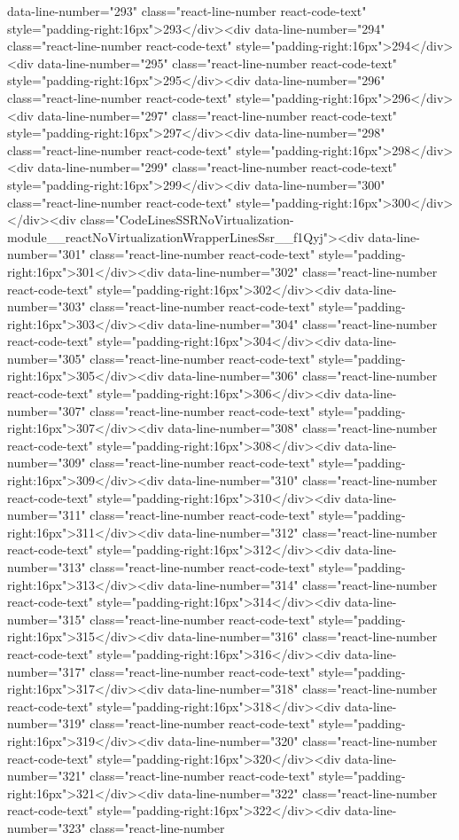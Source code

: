 {{{{{{{data-line-number="293" class="react-line-number react-code-text" style="padding-right:16px">293</div><div data-line-number="294" class="react-line-number react-code-text" style="padding-right:16px">294</div><div data-line-number="295" class="react-line-number react-code-text" style="padding-right:16px">295</div><div data-line-number="296" class="react-line-number react-code-text" style="padding-right:16px">296</div><div data-line-number="297" class="react-line-number react-code-text" style="padding-right:16px">297</div><div data-line-number="298" class="react-line-number react-code-text" style="padding-right:16px">298</div><div data-line-number="299" class="react-line-number react-code-text" style="padding-right:16px">299</div><div data-line-number="300" class="react-line-number react-code-text" style="padding-right:16px">300</div></div><div class="CodeLinesSSRNoVirtualization-module__reactNoVirtualizationWrapperLinesSsr__f1Qyj"><div data-line-number="301" class="react-line-number react-code-text" style="padding-right:16px">301</div><div data-line-number="302" class="react-line-number react-code-text" style="padding-right:16px">302</div><div data-line-number="303" class="react-line-number react-code-text" style="padding-right:16px">303</div><div data-line-number="304" class="react-line-number react-code-text" style="padding-right:16px">304</div><div data-line-number="305" class="react-line-number react-code-text" style="padding-right:16px">305</div><div data-line-number="306" class="react-line-number react-code-text" style="padding-right:16px">306</div><div data-line-number="307" class="react-line-number react-code-text" style="padding-right:16px">307</div><div data-line-number="308" class="react-line-number react-code-text" style="padding-right:16px">308</div><div data-line-number="309" class="react-line-number react-code-text" style="padding-right:16px">309</div><div data-line-number="310" class="react-line-number react-code-text" style="padding-right:16px">310</div><div data-line-number="311" class="react-line-number react-code-text" style="padding-right:16px">311</div><div data-line-number="312" class="react-line-number react-code-text" style="padding-right:16px">312</div><div data-line-number="313" class="react-line-number react-code-text" style="padding-right:16px">313</div><div data-line-number="314" class="react-line-number react-code-text" style="padding-right:16px">314</div><div data-line-number="315" class="react-line-number react-code-text" style="padding-right:16px">315</div><div data-line-number="316" class="react-line-number react-code-text" style="padding-right:16px">316</div><div data-line-number="317" class="react-line-number react-code-text" style="padding-right:16px">317</div><div data-line-number="318" class="react-line-number react-code-text" style="padding-right:16px">318</div><div data-line-number="319" class="react-line-number react-code-text" style="padding-right:16px">319</div><div data-line-number="320" class="react-line-number react-code-text" style="padding-right:16px">320</div><div data-line-number="321" class="react-line-number react-code-text" style="padding-right:16px">321</div><div data-line-number="322" class="react-line-number react-code-text" style="padding-right:16px">322</div><div data-line-number="323" class="react-line-number }}}}}}}

